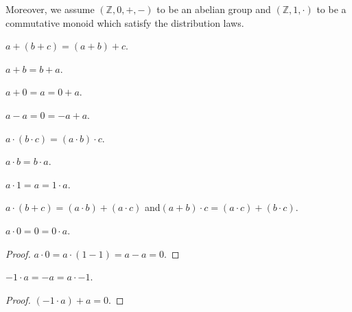 \documentclass[english]{article}
\newcommand{\Int}{\mathbb{Z}}
\begin{document}
  Moreover, we assume $(\Int, 0, +, -)$ to be an abelian group and $(\Int, 1, \cdot)$ to be a
  commutative monoid which satisfy the distribution laws.

  \begin{forthel}
    \begin{axiom}\label{AddAsso}
      $a + (b + c) = (a + b) + c$.
    \end{axiom}

    \begin{axiom}\label{AddComm}
      $a + b = b + a$.
    \end{axiom}

    \begin{axiom}\label{AddZero}
      $a + 0 = a = 0 + a$.
    \end{axiom}

    \begin{axiom}\label{AddNeg}
      $a - a = 0 = -a + a$.
    \end{axiom}

    \begin{axiom}\label{MulAsso}
      $a \cdot (b \cdot c) = (a \cdot b) \cdot c$.
    \end{axiom}

    \begin{axiom}\label{MulComm}
      $a \cdot b = b \cdot a$.
    \end{axiom}

    \begin{axiom}\label{MulOne}
      $a \cdot 1 = a = 1 \cdot a$.
    \end{axiom}

    \begin{axiom}\label{Distrib}
      $a \cdot (b + c) = (a \cdot b) + (a \cdot c)$ and$ (a + b) \cdot c = (a \cdot c) + (b \cdot c)$.
    \end{axiom}

    \begin{lemma}\label{MulZero}
      $a \cdot 0 = 0 = 0 \cdot a$.
    \end{lemma}
    \begin{proof}
      $a \cdot 0 = a \cdot (1 - 1) = a - a = 0$.
    \end{proof}

    \begin{lemma}\label{MulMinOne}
      $-1 \cdot a = -a = a \cdot -1$.
    \end{lemma}
    \begin{proof}
      $(-1 \cdot a) + a = 0$.
    \end{proof}
  \end{forthel}
\end{document}
